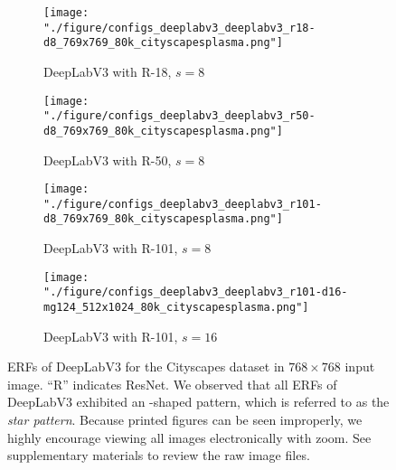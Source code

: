 \documentclass{article}
\begin{document}
\begin{figure}[t!]
	\centering
	\begin{subfigure}[b]{0.241\linewidth}
		\centering
		\texttt{[image: "./figure/configs\_deeplabv3\_deeplabv3\_r18-d8\_769x769\_80k\_cityscapesplasma.png"]}
		\caption{DeepLabV3 with R-18, $s=8$}
	\end{subfigure}
	\hfill
	\begin{subfigure}[b]{0.241\linewidth}
		\centering
		\texttt{[image: "./figure/configs\_deeplabv3\_deeplabv3\_r50-d8\_769x769\_80k\_cityscapesplasma.png"]}
		\caption{DeepLabV3 with R-50, $s=8$}
	\end{subfigure}
	\hfill
	\begin{subfigure}[b]{0.241\linewidth}
		\centering
		\texttt{[image: "./figure/configs\_deeplabv3\_deeplabv3\_r101-d8\_769x769\_80k\_cityscapesplasma.png"]}
		\caption{DeepLabV3 with R-101, $s=8$}
	\end{subfigure}
	\hfill
	\begin{subfigure}[b]{0.241\linewidth}
		\centering
		\texttt{[image: "./figure/configs\_deeplabv3\_deeplabv3\_r101-d16-mg124\_512x1024\_80k\_cityscapesplasma.png"]}
		\caption{DeepLabV3 with R-101, $s=16$}
	\end{subfigure}
	\caption{ERFs of DeepLabV3 for the Cityscapes dataset in $768 \times 768$ input image. ``R'' indicates ResNet. We observed that all ERFs of DeepLabV3 exhibited an \EightStarTaper-shaped pattern, which is referred to as the \textit{star pattern}. Because printed figures can be seen improperly, we highly encourage viewing all images electronically with zoom. See supplementary materials to review the raw image files.}
	\label{fig:d3}
\end{figure}
\end{document}
